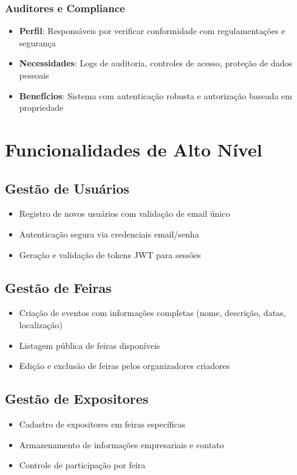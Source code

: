 \documentclass[12pt,a4paper]{article}
\begin{document}
\subsubsection{Auditores e Compliance}
\begin{itemize}
    \item \textbf{Perfil}: Responsáveis por verificar conformidade com regulamentações e segurança
    \item \textbf{Necessidades}: Logs de auditoria, controles de acesso, proteção de dados pessoais
    \item \textbf{Benefícios}: Sistema com autenticação robusta e autorização baseada em propriedade
\end{itemize}

\section{Funcionalidades de Alto Nível}

\subsection{Gestão de Usuários}
\begin{itemize}
    \item Registro de novos usuários com validação de email único
    \item Autenticação segura via credenciais email/senha
    \item Geração e validação de tokens JWT para sessões
\end{itemize}

\subsection{Gestão de Feiras}
\begin{itemize}
    \item Criação de eventos com informações completas (nome, descrição, datas, localização)
    \item Listagem pública de feiras disponíveis
    \item Edição e exclusão de feiras pelos organizadores criadores
\end{itemize}

\subsection{Gestão de Expositores}
\begin{itemize}
    \item Cadastro de expositores em feiras específicas
    \item Armazenamento de informações empresariais e contato
    \item Controle de participação por feira
\end{itemize}
\end{document}
